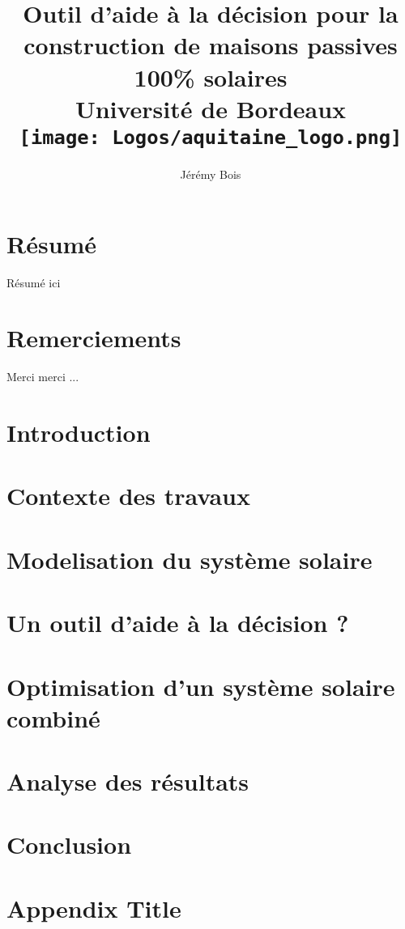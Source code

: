 \documentclass[12pt, oneside]{report}
\title{
    {Outil d’aide à la décision pour la construction de maisons passives 100\% solaires}\\
    {\large Université de Bordeaux}\\
    {\texttt{[image: Logos/aquitaine\_logo.png]}}
}
\author{Jérémy Bois}
\date{}
\begin{document}
\begin{titlepage}
    \maketitle
    \thispagestyle{empty}
\end{titlepage}


\chapter*{Résumé}
Résumé ici

\chapter*{Remerciements}
Merci merci ...


\tableofcontents
\listoffigures
\listoftables
\thispagestyle{empty}
\newpage

% 


\newpage
\listoftodos[Notes]
\newpage

\chapter*{Introduction}


\chapter{Contexte des travaux}


\chapter{Modelisation du système solaire}


\chapter{Un outil d’aide à la décision ?}


\chapter{Optimisation d’un système solaire combiné}


\chapter{Analyse des résultats}


\chapter*{Conclusion}



\appendix
\chapter{Appendix Title}



\printbibliography
\end{document}
